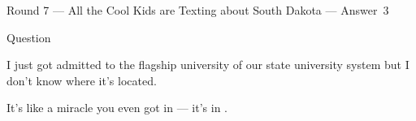 \documentclass[11pt]{beamer}
\begin{document}
\begin{frame}[t]{Round 7 --- All the Cool Kids are Texting about South Dakota --- \mbox{Answer 3}}
\begin{block}{Question}

\begin{minipage}{0.9\textwidth}
\begin{mdframed}[
    roundcorner=7pt,
    backgroundcolor=black!5,
    linecolor=black!5,
    fontcolor=black,
    ignorelastdescenders]
\begin{flushleft}
{\small{}\selectfont{}
I just got admitted to the flagship university of our state university system but I don't know where it's located.
}
\end{flushleft}
\end{mdframed}
\end{minipage}

\hfill{}\begin{minipage}{0.9\textwidth}
\begin{mdframed}[
    roundcorner=7pt,
    backgroundcolor=blue!80!white,
    linecolor=blue!80!white,
    fontcolor=white,
    ignorelastdescenders]
\begin{flushleft}
{\small{}\selectfont{}
It's like a miracle you even got in --- it's in \textunderscore{}\textunderscore{}\textunderscore{}\textunderscore{}\textunderscore{}\textunderscore{}.
}
\end{flushleft}
\end{mdframed}
\end{minipage}
\end{block}
\end{frame}
\end{document}

